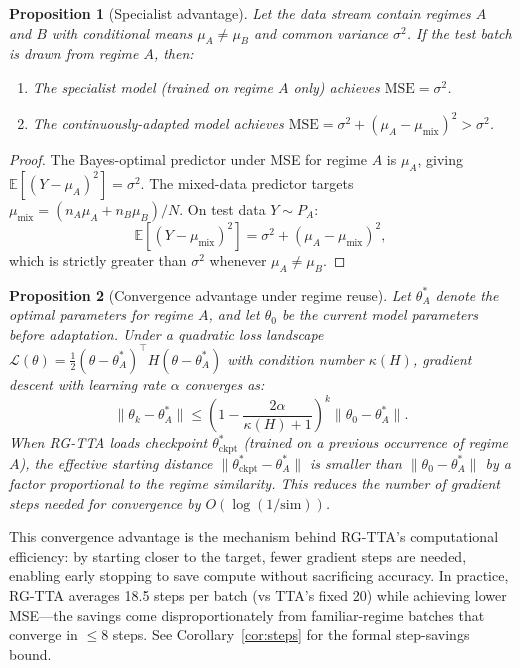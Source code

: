 \documentclass[11pt,a4paper]{article}
\newtheorem{proposition}{Proposition}
\begin{document}
\begin{proposition}[Specialist advantage]
\label{prop:specialist}
Let the data stream contain regimes $A$ and $B$ with conditional means $\mu_A \neq \mu_B$ and common variance $\sigma^2$. If the test batch is drawn from regime $A$, then:
\begin{enumerate}[nosep]
  \item The specialist model (trained on regime $A$ only) achieves $\text{MSE} = \sigma^2$.
  \item The continuously-adapted model achieves $\text{MSE} = \sigma^2 + (\mu_A - \mu_{\text{mix}})^2 > \sigma^2$.
\end{enumerate}
\end{proposition}

\begin{proof}
The Bayes-optimal predictor under MSE for regime $A$ is $\mu_A$, giving $\mathbb{E}[(Y - \mu_A)^2] = \sigma^2$. The mixed-data predictor targets $\mu_{\text{mix}} = (n_A \mu_A + n_B \mu_B) / N$. On test data $Y \sim P_A$:
\[
  \mathbb{E}[(Y - \mu_{\text{mix}})^2] = \sigma^2 + (\mu_A - \mu_{\text{mix}})^2,
\]
which is strictly greater than $\sigma^2$ whenever $\mu_A \neq \mu_B$.
\end{proof}

\begin{proposition}[Convergence advantage under regime reuse]
\label{prop:convergence}
Let $\theta^*_A$ denote the optimal parameters for regime $A$, and let $\theta_0$ be the current model parameters before adaptation. Under a quadratic loss landscape $\mathcal{L}(\theta) = \frac{1}{2}(\theta - \theta^*_A)^\top H (\theta - \theta^*_A)$ with condition number $\kappa(H)$, gradient descent with learning rate $\alpha$ converges as:
\[
  \|\theta_k - \theta^*_A\| \leq \left(1 - \frac{2\alpha}{\kappa(H) + 1}\right)^k \|\theta_0 - \theta^*_A\|.
\]
When RG-TTA loads checkpoint $\theta^*_{\text{ckpt}}$ (trained on a previous occurrence of regime $A$), the effective starting distance $\|\theta^*_{\text{ckpt}} - \theta^*_A\|$ is smaller than $\|\theta_0 - \theta^*_A\|$ by a factor proportional to the regime similarity. This reduces the number of gradient steps needed for convergence by $O(\log(1/\text{sim}))$.
\end{proposition}

This convergence advantage is the mechanism behind RG-TTA's computational efficiency: by starting closer to the target, fewer gradient steps are needed, enabling early stopping to save compute without sacrificing accuracy. In practice, RG-TTA averages 18.5 steps per batch (vs TTA's fixed 20) while achieving lower MSE---the savings come disproportionately from familiar-regime batches that converge in $\leq$8 steps. See Corollary~\ref{cor:steps} for the formal step-savings bound.
\end{document}
